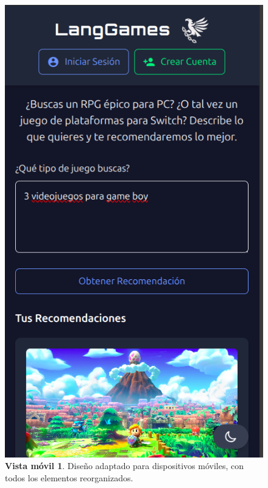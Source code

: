 \begin{figure}[H]
	\centering
	\includegraphics[width=1\linewidth]{imagenes/homeMovil1.png}
	\caption[\textbf{Vista móvil 1}.]{\textbf{Vista móvil 1}. Diseño adaptado para dispositivos móviles, con todos los elementos reorganizados.}
	\label{imagen-movil-1}
\end{figure}

